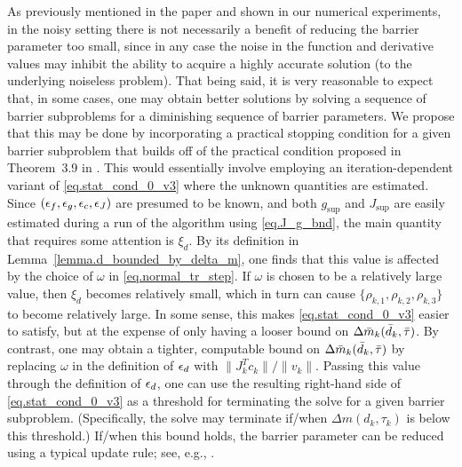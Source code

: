 As previously mentioned in the paper and shown in our numerical experiments, in the noisy setting there is not necessarily a benefit of reducing the barrier parameter too small, since in any case the noise in the function and derivative values may inhibit the ability to acquire a highly accurate solution (to the underlying noiseless problem).  That being said, it is very reasonable to expect that, in some cases, one may obtain better solutions by solving a sequence of barrier subproblems for a diminishing sequence of barrier parameters.  We propose that this may be done by incorporating a practical stopping condition for a given barrier subproblem that builds off of the practical condition proposed in Theorem~3.9 in \cite{dezfulian2024convergence}.  This would essentially involve employing an iteration-dependent variant of \eqref{eq.stat_cond_0_v3} where the unknown quantities are estimated.  Since $(\epsilon_f,\epsilon_g,\epsilon_c,\epsilon_J)$ are presumed to be known, and both $g_{\sup}$ and $J_{\sup}$ are easily estimated during a run of the algorithm using \eqref{eq.J_g_bnd}, the main quantity that requires some attention is $\xi_d$.  By its definition in Lemma~\ref{lemma.d_bounded_by_delta_m}, one finds that this value is affected by the choice of $\omega$ in \eqref{eq.normal_tr_step}.  If $\omega$ is chosen to be a relatively large value, then $\xi_d$ becomes relatively small, which in turn can cause $\{\rho_{k,1},\rho_{k,2},\rho_{k,3}\}$ to become relatively large.  In some sense, this makes \eqref{eq.stat_cond_0_v3} easier to satisfy, but at the expense of only having a looser bound on $\Delta {\bar m}_k ({\bar d}_k,{\bar \tau})$.  By contrast, one may obtain a tighter, computable bound on $\Delta {\bar m}_k ({\bar d}_k,{\bar \tau})$ by replacing $\omega$ in the definition of $\epsilon_d$ with $\|J_k^T c_k\|/\|v_k\|$.  Passing this value through the definition of $\epsilon_d$, one can use the resulting right-hand side of \eqref{eq.stat_cond_0_v3} as a threshold for terminating the solve for a given barrier subproblem.  (Specifically, the solve may terminate if/when $\Delta m(d_k,\tau_k)$ is below this threshold.)  If/when this bound holds, the barrier parameter can be reduced using a typical update rule; see, e.g., \cite{wachter2006implementation}.